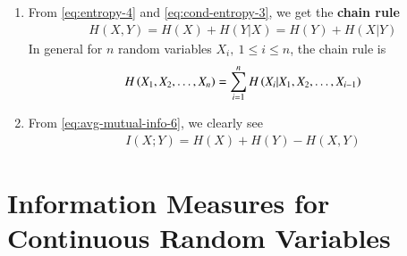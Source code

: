 \documentclass[journal,12pt,twocolumn]{IEEEtran}
\renewcommand\thesection{\arabic{section}}
\begin{document}
\begin{enumerate}[label=\thesection.\arabic*, ref=\thesection.\theenumi]
    \item From \eqref{eq:entropy-4} and \eqref{eq:cond-entropy-3}, we get the 
    \textbf{chain rule}
    \begin{align}
        H(X,Y) = H(X) + H(Y|X) = H(Y) + H(X|Y) \label{eq:chain-rule-two}
    \end{align}
    In general for $n$ random variables $X_i,\ 1 \le i \le n$, the chain rule is 
    \begin{align}
        H\left(X_1,X_2,\ldots,X_n\right) = \sum_{i=1}^n H\left(X_i|X_1,X_2,\ldots,X_{i-1}\right)
        \label{eq:chain-rule-gen}
    \end{align}
    \item From \eqref{eq:avg-mutual-info-6}, we clearly see
    \begin{align}
        I(X;Y) = H(X) + H(Y) - H(X,Y) \label{eq:mutual-self-eqn}
    \end{align}
\end{enumerate}

\section{Information Measures for Continuous Random Variables}
\end{document}
